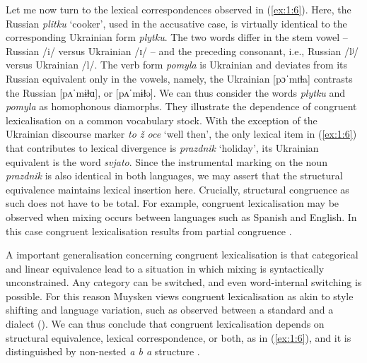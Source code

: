 Let me now turn to the lexical correspondences observed in (\ref{ex:1:6}). Here, the Russian \textit{plitku} `cooker', used in the accusative case, is virtually identical to the corresponding Ukrainian form \textit{plytku}. The two words differ in the stem vowel -- Russian /i/ versus Ukrainian /ɪ/ -- and the preceding consonant, i.e., Russian /lʲ/ versus Ukrainian /l/. The verb form \textit{pomyla} is Ukrainian and deviates from its Russian equivalent only in the vowels, namely, the Ukrainian [pɔˈmɪɫa] contrasts the Russian [pʌˈmɨɫɑ], or [pʌˈmɨɫə]. We can thus consider the words \textit{plytku} and \textit{pomyla} as homophonous diamorphs. They illustrate the dependence of congruent lexicalisation on a common vocabulary stock. With the exception of the Ukrainian discourse marker \textit{to ž oce} `well then', the only lexical item in (\ref{ex:1:6}) that contributes to lexical divergence is \textit{prazdnik} `holiday', its Ukrainian equivalent is the word \textit{svjato}. Since the instrumental marking on the noun \textit{prazdnik} is also identical in both languages, we may assert that the structural equivalence  maintains lexical insertion here. Crucially, structural congruence as such does not have to be total. For example, congruent lexicalisation may be observed when mixing occurs between languages such as Spanish and English. In this case congruent lexicalisation results from partial congruence \citep[cf.][6]{muysken-bilingual-2000}.

A important generalisation concerning congruent lexicalisation is that categorical and linear equivalence lead to a situation in which mixing is syntactically unconstrained. Any category can be switched, and even word-internal switching is possible. For this reason Muysken views congruent lexicalisation as akin to style shifting and language variation, such as observed between a standard and a dialect (\citeyear[127--128]{muysken-bilingual-2000}). We can thus conclude that congruent lexicalisation depends on structural equivalence, lexical correspondence, or both, as in (\ref{ex:1:6}), and it is distinguished by non-nested \textit{a b a} structure \citep[129]{muysken-bilingual-2000}.

